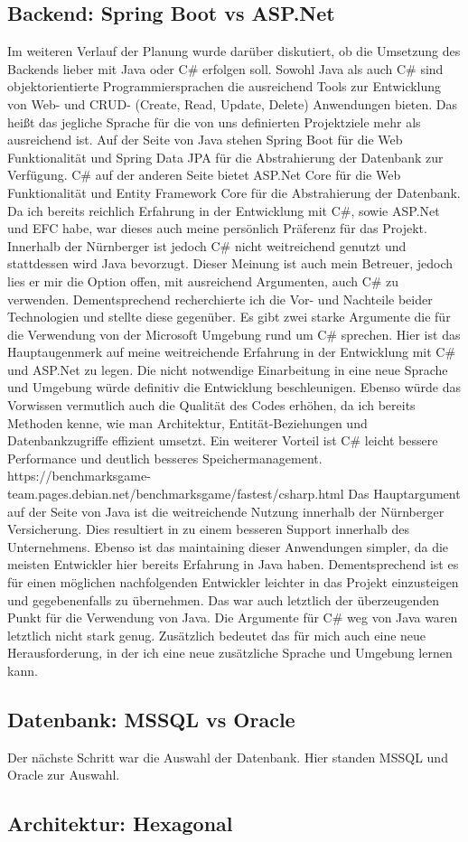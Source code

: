 \subsection{Backend: Spring Boot vs ASP.Net}
Im weiteren Verlauf der Planung wurde darüber diskutiert, ob die Umsetzung des Backends lieber mit Java oder C\# erfolgen soll. 
Sowohl Java als auch C\# sind objektorientierte Programmiersprachen die ausreichend Tools zur Entwicklung von Web- und CRUD- (Create, Read, Update, Delete) Anwendungen bieten.
Das heißt das jegliche Sprache für die von uns definierten Projektziele mehr als ausreichend ist.
Auf der Seite von Java stehen Spring Boot für die Web Funktionalität und Spring Data JPA für die Abstrahierung der Datenbank zur Verfügung.
C\# auf der anderen Seite bietet ASP.Net Core für die Web Funktionalität und Entity Framework Core für die Abstrahierung der Datenbank.
Da ich bereits reichlich Erfahrung in der Entwicklung mit C\#, sowie ASP.Net und EFC habe, war dieses auch meine persönlich Präferenz für das Projekt.
Innerhalb der Nürnberger ist jedoch C\# nicht weitreichend genutzt und stattdessen wird Java bevorzugt. Dieser Meinung ist auch mein Betreuer, jedoch lies er mir die Option offen, mit 
ausreichend Argumenten, auch C\# zu verwenden. 
Dementsprechend recherchierte ich die Vor- und Nachteile beider Technologien und stellte diese gegenüber.
Es gibt zwei starke Argumente die für die Verwendung von der Microsoft Umgebung rund um C\# sprechen.
Hier ist das Hauptaugenmerk auf meine weitreichende Erfahrung in der Entwicklung mit C\# und ASP.Net zu legen.
Die nicht notwendige Einarbeitung in eine neue Sprache und Umgebung würde definitiv die Entwicklung beschleunigen.
Ebenso würde das Vorwissen vermutlich auch die Qualität des Codes erhöhen, da ich bereits Methoden kenne, wie man Architektur, Entität-Beziehungen und Datenbankzugriffe effizient umsetzt.
Ein weiterer Vorteil ist C\# leicht bessere Performance und deutlich besseres Speichermanagement. https://benchmarksgame-team.pages.debian.net/benchmarksgame/fastest/csharp.html
Das Hauptargument auf der Seite von Java ist die weitreichende Nutzung innerhalb der Nürnberger Versicherung. Dies resultiert in zu einem besseren Support innerhalb des Unternehmens.
Ebenso ist das maintaining dieser Anwendungen simpler, da die meisten Entwickler hier bereits Erfahrung in Java haben. Dementsprechend ist es für einen möglichen nachfolgenden Entwickler leichter
in das Projekt einzusteigen und gegebenenfalls zu übernehmen.
Das war auch letztlich der überzeugenden Punkt für die Verwendung von Java. Die Argumente für C\# weg von Java waren letztlich nicht stark genug.
Zusätzlich bedeutet das für mich auch eine neue Herausforderung, in der ich eine neue zusätzliche Sprache und Umgebung lernen kann.

\subsection{Datenbank: MSSQL vs Oracle}
Der nächste Schritt war die Auswahl der Datenbank. Hier standen MSSQL und Oracle zur Auswahl.
\subsection{Architektur: Hexagonal}

